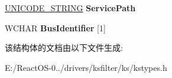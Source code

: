 \begin{DoxyCompactItemize}
\item 
\mbox{\label{struct_____b_u_s___e_n_u_m___d_e_v_i_c_e___e_x_t_e_n_s_i_o_n_____a358f4294ec19c538fcdf574d013d4d9d}} 
\hyperlink{struct___u_n_i_c_o_d_e___s_t_r_i_n_g}{U\+N\+I\+C\+O\+D\+E\+\_\+\+S\+T\+R\+I\+NG} {\bfseries Service\+Path}
\item 
\mbox{\label{struct_____b_u_s___e_n_u_m___d_e_v_i_c_e___e_x_t_e_n_s_i_o_n_____a269a0117c46c22ec17ad6b4d5c591250}} 
W\+C\+H\+AR {\bfseries Bus\+Identifier} \mbox{[}1\mbox{]}
\end{DoxyCompactItemize}


该结构体的文档由以下文件生成\+:\begin{DoxyCompactItemize}
\item 
E\+:/\+React\+O\+S-\/0../drivers/ksfilter/ks/kstypes.\+h\end{DoxyCompactItemize}
